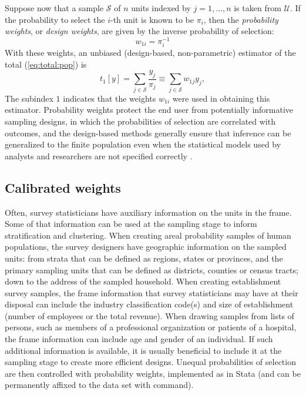 Suppose now that a sample $\mathcal S$ of $n$ units indexed by $j=1,\ldots,n$
is taken from $\mathcal U$. If the probability to select the
$i$-th unit is known to be $\pi_i$, then
the {\it probability weights}, or {\it design weights}, are given by
the inverse probability of selection:
\begin{equation}
   w_{1i} = \pi_i^{-1}
   \label{eq:prob:weight}
\end{equation}
With these weights, an unbiased
(design-based, non-parametric) estimator
of the total (\ref{eq:total:pop}) is \citep{horvitz:thompson:1952}
\begin{equation}
   t_{1}[y] = \sum_{j \in \mathcal{S}} \frac{y_j}{\pi_j}
   \equiv \sum_{j \in \mathcal{S}} w_{1j} y_j
   \label{eq:total:sample},
\end{equation}
The subindex $1$ indicates that the weights $w_{1i}$ were
used in obtaining this estimator. Probability weights protect
the end user from potentially informative sampling designs, in which
the probabilities of selection are correlated with outcomes, and 
the design-based methods generally ensure that inference can be generalized
to the finite population even when the statistical models used
by analysts and researchers are not specified correctly
\citep{pfeff:1993,binder:roberts:2003}.

\subsection{Calibrated weights}
\label{subsec:calibration}

Often, survey statisticians have auxiliary information on the units
in the frame. Some of that information can be used at the sampling
stage to inform stratification and clustering. When creating areal
probability samples of human populations, the survey designers have
geographic information on the sampled units: from strata
that can be defined as regions, states or provinces, and the primary
sampling units that can be defined as districts, counties or census tracts;
down to the address of the sampled household. When creating establishment
survey samples, the frame information that survey statisticians may have
at their disposal can include the industry classification code(s) and size
of establishment (number of employees or the total revenue).
When drawing samples from lists of persons, such as members of a
professional organization or patients of a hospital, the frame information
can include age and gender of an individual. If such additional information
is available, it is usually beneficial to include it at the sampling stage
to create more efficient designs. Unequal probabilities of selection
are then controlled with probability weights, implemented
as \stcmd{[pw=}{\it exp}\stcmd{]} in Stata (and can be permanently
affixed to the data set with  command).


